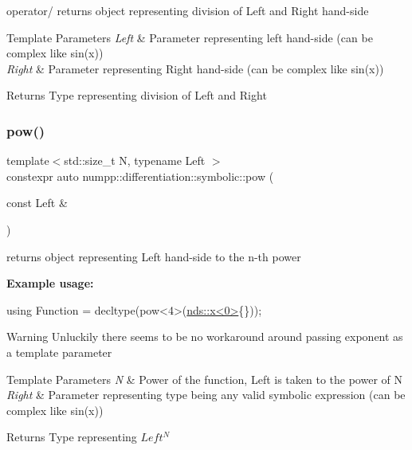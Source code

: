 operator/ returns object representing division of Left and Right hand-\/side 
\begin{DoxyTemplParams}{Template Parameters}
{\em Left} & Parameter representing left hand-\/side (can be complex like sin(x)) \\
\hline
{\em Right} & Parameter representing Right hand-\/side (can be complex like sin(x))\\
\hline
\end{DoxyTemplParams}
\begin{DoxyReturn}{Returns}
Type representing division of Left and Right
\end{DoxyReturn}
\mbox{\label{group__numpp__differentiation__symbolic_gaa52e3714ea3492f60c68cdb4974fe495}} 
\subsubsection{\texorpdfstring{pow()}{pow()}}
{\footnotesize\ttfamily template$<$std\+::size\+\_\+t N, typename Left $>$ \\
constexpr auto numpp\+::differentiation\+::symbolic\+::pow (\begin{DoxyParamCaption}\item[{const Left \&}]{ }\end{DoxyParamCaption})}

returns object representing Left hand-\/side to the n-\/th power

{\bfseries Example usage\+:} 
\begin{DoxyCode}
\textcolor{keyword}{using} Function = decltype(pow<4>(\hyperlink{classnumpp_1_1differentiation_1_1symbolic_1_1variable}{nds::x<0>}\{\}));
\end{DoxyCode}


\begin{DoxyWarning}{Warning}
Unluckily there seems to be no workaround around passing exponent as a template parameter
\end{DoxyWarning}

\begin{DoxyTemplParams}{Template Parameters}
{\em N} & Power of the function, Left is taken to the power of N \\
\hline
{\em Right} & Parameter representing type being any valid symbolic expression (can be complex like sin(x))\\
\hline
\end{DoxyTemplParams}
\begin{DoxyReturn}{Returns}
Type representing $ Left^N $
\end{DoxyReturn}
\mbox{\label{group__numpp__differentiation__symbolic_ga49ba3eed5ff463e79a88f4952f73f435}} 
